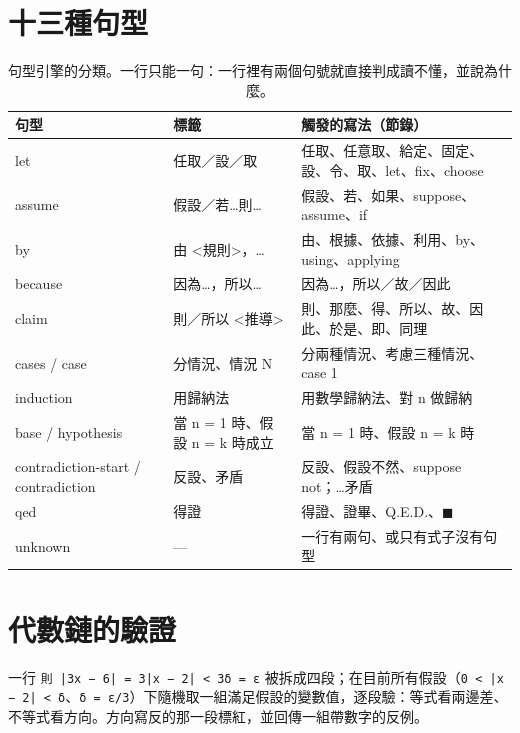 \documentclass[11pt,a4paper,oneside]{report}
\renewcommand{\_}{\ifmmode\origunderscore\else\textunderscore\allowbreak\fi}
\newcommand{\code}[1]{\texttt{#1}}
\begin{document}
\section{十三種句型}
\begin{table}[h]
\centering\small\sffamily
\begin{tabularx}{\textwidth}{@{}llY@{}}
\toprule
句型 & 標籤 & 觸發的寫法（節錄） \\
\midrule
let & 任取／設／取 & 任取、任意取、給定、固定、設、令、取、let、fix、choose \\
assume & 假設／若…則… & 假設、若、如果、suppose、assume、if \\
by & 由 <規則>，… & 由、根據、依據、利用、by、using、applying \\
because & 因為…，所以… & 因為…，所以／故／因此 \\
claim & 則／所以 <推導> & 則、那麼、得、所以、故、因此、於是、即、同理 \\
cases / case & 分情況、情況 N & 分兩種情況、考慮三種情況、case 1 \\
induction & 用歸納法 & 用數學歸納法、對 n 做歸納 \\
base / hypothesis & 當 n = 1 時、假設 n = k 時成立 & 當 n = 1 時、假設 n = k 時 \\
contradiction-start / contradiction & 反設、矛盾 & 反設、假設不然、suppose not；…矛盾 \\
qed & 得證 & 得證、證畢、Q.E.D.、$\blacksquare$ \\
unknown & — & 一行有兩句、或只有式子沒有句型 \\
\bottomrule
\end{tabularx}
\caption{句型引擎的分類。一行只能一句：一行裡有兩個句號就直接判成讀不懂，並說為什麼。}
\end{table}

\section{代數鏈的驗證}
一行 \code{則 |3x − 6| = 3|x − 2| < 3δ = ε} 被拆成四段；在目前所有假設（\code{0 < |x − 2| < δ}、\code{δ = ε/3}）下隨機取一組滿足假設的變數值，逐段驗：等式看兩邊差、不等式看方向。方向寫反的那一段標紅，並回傳一組帶數字的反例。
\end{document}
